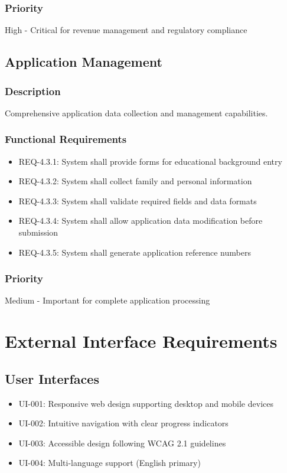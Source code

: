 \documentclass[11pt]{article}
\begin{document}
\subsubsection{Priority}
High - Critical for revenue management and regulatory compliance

\subsection{Application Management}
\subsubsection{Description}
Comprehensive application data collection and management capabilities.

\subsubsection{Functional Requirements}
\begin{itemize}
    \item REQ-4.3.1: System shall provide forms for educational background entry
    \item REQ-4.3.2: System shall collect family and personal information
    \item REQ-4.3.3: System shall validate required fields and data formats
    \item REQ-4.3.4: System shall allow application data modification before submission
    \item REQ-4.3.5: System shall generate application reference numbers
\end{itemize}

\subsubsection{Priority}
Medium - Important for complete application processing

\section{External Interface Requirements}

\subsection{User Interfaces}
\begin{itemize}
    \item UI-001: Responsive web design supporting desktop and mobile devices
    \item UI-002: Intuitive navigation with clear progress indicators
    \item UI-003: Accessible design following WCAG 2.1 guidelines
    \item UI-004: Multi-language support (English primary)
\end{itemize}
\end{document}
